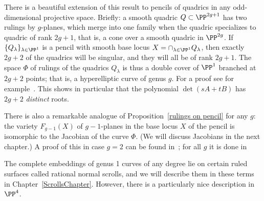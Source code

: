\begin{fact}
 There is a beautiful extension of this result to pencils of quadrics in any odd-dimensional projective space. Briefly: a smooth quadric $Q \subset \PP^{2g+1}$ has two rulings by $g$-planes, which merge into one family when the quadric specializes to quadric of rank $2g+1$, that is, a cone over a smooth quadric in $\PP^{2g}$. If $\{Q_\lambda\}_{\lambda \in \PP^1}$ is a pencil with smooth base locus $X = \cap_{\lambda \in \PP^1} Q_\lambda$, then exactly $2g+2$ of the quadrics will be singular, and they will all be of rank $2g+1$. The space $\Phi$ of rulings of the quadrics $Q_\lambda$ is thus a double cover of $\PP^1$ branched at $2g+2$  points; that is, a hyperelliptic curve of genus $g$. For a proof see for example~\cite[Proposition 22.34]{Harris1995}.
 This shows in particular that the polynomial $\det(sA+tB)$ has $2g+2$ \emph{distinct} roots. 

 There is also a remarkable analogue of Proposition~\ref{rulings on pencil} for any $g$: the variety $F_{g-1}(X)$ of $g-1$-planes in the base locus $X$ of the pencil is isomorphic to the Jacobian of the  curve $\Phi$. (We will discuss Jacobians in the next chapter.) A proof of this in case $g=2$ can be found in~\cite{Griffiths-Harris1978}; for all $g$ it is done in~\cite{Donagi}
\end{fact}

The complete embeddings of genus 1 curves of any degree lie on certain ruled surfaces called rational
normal scrolls, and we will describe them in these terms in Chapter~\ref{ScrollsChapter}. However, there is a particularly nice description in $\PP^4$. 

